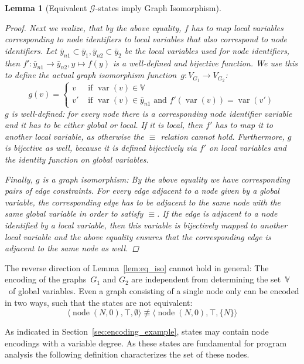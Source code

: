 \documentclass{tlp}
\newtheorem{lemma}[theorem]{Lemma}
\newcommand{\st}[3]{\ensuremath{\langle #1 , #2 , #3 \rangle}}
\newcommand{\mcG}{\ensuremath{\mathcal{G}}}
\newcommand{\bbV}{\ensuremath{\mathbb{V}}}
\DeclareMathOperator{\var}{var}
\DeclareMathOperator{\node}{node}
\begin{document}
\begin{lemma}[Equivalent \mcG-states imply Graph Isomorphism]
\begin{proof}
Next we realize, that by the above equality, $f$ has to map local variables
corresponding to node identifiers to local variables that also correspond to node
identifiers. Let $\bar y_{n1} \subset \bar y_1, \bar y_{n2} \subset \bar y_2$
be the local variables used for node identifiers, then $f' : \bar y_{n1}
\rightarrow \bar y_{n2}, y \mapsto f(y)$ is a well-defined and bijective
function. We use this to define the actual graph isomorphism function~$g :
V_{G_1} \rightarrow V_{G_2}$:
\[
g(v) = \left\{ \begin{array}{ll}
              v & \text{ if } \var(v) \in \bbV \\
              v' & \text{ if } \var(v) \in \bar y_{n1} \text{ and }
              f'(\var(v)) = \var(v')
              \end{array}\right.
\]
$g$ is well-defined: for every node there is a corresponding node identifier
variable and it has to be either global or local. If it is local, then $f'$ has
to map it to another local variable, as otherwise the $\equiv$ relation cannot
hold. Furthermore, $g$ is bijective as well, because it is defined
bijectively via $f'$ on local variables and the identity function on global
variables.

Finally, $g$ is a graph isomorphism: By the above equality we have corresponding
pairs of edge constraints. For every edge adjacent to a node given by a global
variable, the corresponding edge has to be adjacent to the same node with the
same global variable in order to satisfy $\equiv$. If the edge is adjacent to a
node identified by a local variable, then this variable is bijectively mapped to
another local variable and the above equality ensures that the corresponding edge
is adjacent to the same node as well. 
\end{proof}
\end{lemma}

The reverse direction of Lemma~\ref{lem:eq_iso} cannot hold in general:
The encoding of the graphs~$G_1$ and $G_2$ are independent from determining the
set~\bbV\ of global variables. Even a graph consisting of a single node only can
be encoded in two ways, such that the states are not equivalent:
\[
\st{\node(N, 0)}{\top}{\emptyset} \not \equiv \st{\node(N, 0)}{\top}{\{N\}}
\]

As indicated in Section~\ref{sec:encoding_example}, states may contain node
encodings with a variable degree. As these states are fundamental for program
analysis the following definition characterizes the set of these nodes.
\end{document}
